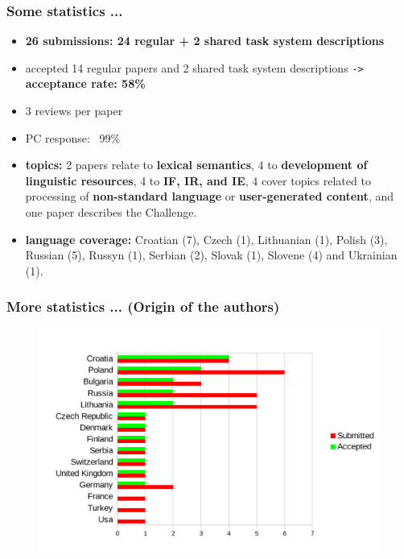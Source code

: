 \documentclass{beamer}
\begin{document}
\begin{frame}[fragile]
 \frametitle{Some statistics ...}

\begin{itemize}

\item \textbf{26 submissions: 24 regular + 2 shared task system descriptions}

\item accepted 14 regular papers and 2 shared task system descriptions \verb+->+  \textbf{acceptance rate: 58\%}

\item 3 reviews per paper

\item PC response: ~99\%

\item \textbf{topics:} 2 papers relate to \textbf{lexical semantics}, 4 to \textbf{development of
linguistic resources}, 4 to \textbf{IF, IR, and IE}, 4 cover topics related to processing of \textbf{non-standard language} 
or \textbf{user-generated content}, and one paper describes the Challenge.

\item \textbf{language coverage:} Croatian (7), Czech (1), Lithuanian (1), Polish (3), Russian (5), Russyn (1), Serbian (2), Slovak (1), Slovene (4) and Ukrainian (1).

\end{itemize}

\end{frame}

\begin{frame}[fragile]
 \frametitle{More statistics ... (Origin of the authors)}

\begin{figure}[h!]
    \centering\leavevmode
    \hspace{1cm}
    \includegraphics[scale=0.6]{stats.pdf}
\end{figure} %

\end{frame}
\end{document}
